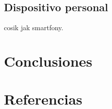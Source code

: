 \documentclass[a4paper,11pt]{scrartcl}
\begin{document}
 \subsection{Dispositivo personal}
 cosik jak smartfony.
 
 
\section{Conclusiones}

\section{Referencias}
\printbibliography
\end{document}
